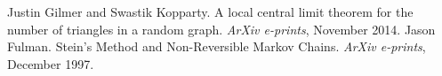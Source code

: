 \documentclass{article}
\begin{document}
	\begin{thebibliography}{0}
			Justin Gilmer and Swastik Kopparty.
			A local central limit theorem for the number of triangles in a random graph.
			\emph{ArXiv e-prints},
			November 2014.
			Jason Fulman.
			Stein's Method and Non-Reversible Markov Chains.
			\emph{ArXiv e-prints},
			December 1997.
	\end{thebibliography}
\end{document}

